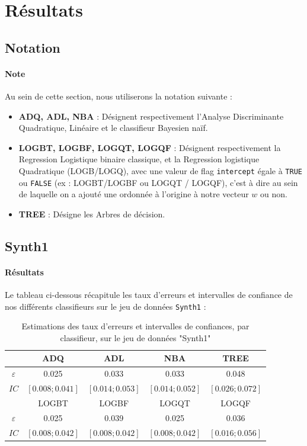 \documentclass{report}
\begin{document}
\section{Résultats}
\subsection{Notation}
\paragraph{Note}
Au sein de cette section, nous utiliserons la notation suivante :
\begin{itemize}
    \item \textbf{ADQ, ADL, NBA} : Désignent respectivement l'Analyse Discriminante Quadratique, Linéaire et le classifieur Bayesien naïf.
    \item \textbf{LOGBT, LOGBF, LOGQT, LOGQF} : Désignent respectivement la Regression Logistique binaire classique, et la Regression logistique Quadratique (LOGB/LOGQ), avec une valeur de flag \verb+intercept+ égale à \verb+TRUE+ ou \verb+FALSE+ (ex : LOGBT/LOGBF ou LOGQT / LOGQF), c'est à dire au sein de laquelle on a ajouté une ordonnée à l'origine à notre vecteur $w$ ou non.
    \item \textbf{TREE} : Désigne les Arbres de décision.
\end{itemize}

\newpage
\subsection{Synth1}
\paragraph{Résultats}
Le tableau ci-dessous récapitule les taux d'erreurs et intervalles de confiance de nos différents classifieurs sur le jeu de données \verb+Synth1+ :

\begin{table}[h!]
    \centering
    \caption{Estimations des taux d'erreurs et intervalles de confiances, par classifieur, sur le jeu de données "Synth1"}
    \label{tab:table1}
    \def\arraystretch{1.5}
    \begin{tabular}{c||c|c|c|c}
        \hline
        & ADQ & ADL & NBA & TREE\\
        \hline
        $\varepsilon$ & 0.025 & 0.033 & 0.033
        & 0.048\\
        \hline
        $IC$ & $[0.008 ; 0.041]$ & $[0.014 ; 0.053]$ & $[0.014 ; 0.052]$
        & $[0.026 ; 0.072]$\\
        \hline
        \hline
        & LOGBT & LOGBF & LOGQT & LOGQF\\
        \hline
        $\varepsilon$ & 0.025 & 0.039 & 0.025 & 0.036\\
        \hline
        $IC$ & $[0.008 ; 0.042]$ & $[0.008 ; 0.042]$ & $[0.008 ; 0.042]$ & $[0.016 ; 0.056]$\\
        \hline
        \hline
    \end{tabular}
\end{table}
\end{document}
